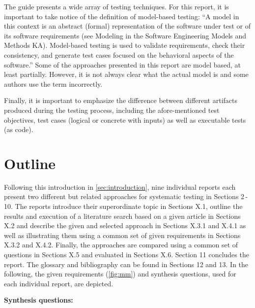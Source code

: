 The guide presents a wide array of testing techniques.
For this report, it is important to take notice of the definition of model-based testing: \enquote{A model in this context is an abstract (formal) representation of the software under test or of its software requirements (see Modeling in the Software Engineering Models and Methods KA).
Model-based testing is used to validate requirements, check their consistency, and generate test cases focused on the behavioral aspects of the software.}\cite{SWEBOK}
Some of the approaches presented in this report are model based, at least partially.
However, it is not always clear what the actual model is and some authors use the term incorrectly.

Finally, it is important to emphasize the difference between different artifacts produced during the testing process, including the afore-mentioned test objectives, test cases (logical or concrete with inputs) as well as executable tests (as code).

\section{Outline}

Following this introduction in \autoref{sec:introduction}, nine individual reports each present two different but related approaches for systematic testing in Sections 2\,-\,10.
The reports introduce their superordinate topic in Sections X.1, outline the results and execution of a literature search based on a given article in Sections X.2 and describe the given and selected approach in Sections X.3.1 and X.4.1 as well as illustrating them using a common set of given requirements in Sections X.3.2 and X.4.2.
Finally, the approaches are compared using a common set of questions in Sections X.5 and evaluated in Sections X.6.
Section 11 concludes the report.
The glossary and bibliography can be found in Sections 12 and 13.
In the following, the given requirements (\autoref{fig:mm}) and synthesis questions, used for each individual report, are depicted.

\textbf{Synthesis questions:}

